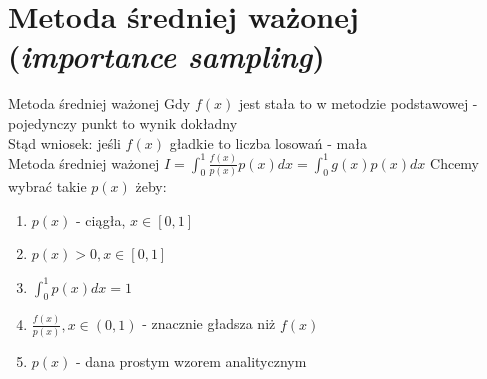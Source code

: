 \section{Metoda średniej ważonej ({\it importance sampling})}
\begin{frame}{Metoda średniej ważonej}
	Gdy $f(x)$ jest stała to w metodzie podstawowej - pojedynczy punkt to wynik dokładny \\
    Stąd wniosek: jeśli $f(x)$ gładkie to liczba losowań - mała
    \\[8pt]
    Metoda średniej ważonej 
     $I = \int_0^1 \frac{f(x)}{p(x)} p(x) dx = \int_0^1 g(x)p(x)dx$
    Chcemy wybrać takie $p(x)$ żeby:
    \begin{enumerate}
         \item $p(x)$ - ciągła, $x \in [0, 1]$  
    	\item $p(x) > 0, x \in [0, 1]$
        \item $\int_0^1 p(x) dx = 1$
        \item $\frac{f(x)}{p(x)}, x \in (0, 1)$ - znacznie gładsza niż $f(x)$
        \item $p(x)$ - dana prostym wzorem analitycznym
    \end{enumerate}
    
\end{frame}
        
